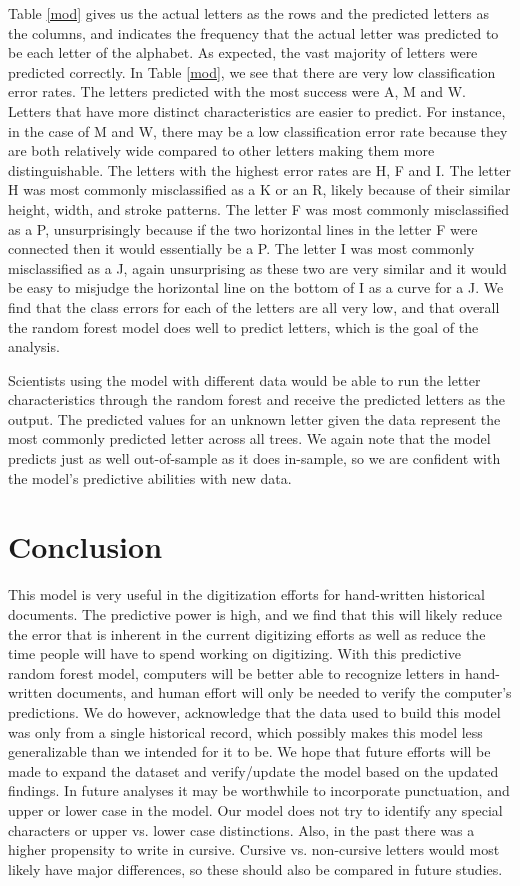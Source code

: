 \documentclass{svproc}
\begin{document}
Table \ref{mod} gives us the actual letters as the rows and the predicted letters as the columns, and indicates the frequency that the actual letter was predicted to be each letter of the alphabet. As expected, the vast majority of letters were predicted correctly. In Table \ref{mod}, we see that there are very low classification error rates. The letters predicted with the most success were A, M and W. Letters that have more distinct characteristics are easier to predict. For instance, in the case of M and W, there may be a low classification error rate because they are both relatively wide compared to other letters making them more distinguishable. The letters with the highest error rates are H, F and I. The letter H was most commonly misclassified as a K or an R, likely because of their similar height, width, and stroke patterns. The letter F was most commonly misclassified as a P, unsurprisingly because if the two horizontal lines in the letter F were connected then it would essentially be a P. The letter I was most commonly misclassified as a J, again unsurprising as these two are very similar and it would be easy to misjudge the horizontal line on the bottom of I as a curve for a J. We find that the class errors for each of the letters are all very low, and that overall the random forest model does well to predict letters, which is the goal of the analysis.

Scientists using the model with different data would be able to run the letter characteristics through the random forest and receive the predicted letters as the output. The predicted values for an unknown letter given the data represent the most commonly predicted letter across all trees. We again note that the model predicts just as well out-of-sample as it does in-sample, so we are confident with the model's predictive abilities with new data. 

\section{Conclusion}

This model is very useful in the digitization efforts for hand-written historical documents. The predictive power is high, and we find that this will likely reduce the error that is inherent in the current digitizing efforts as well as reduce the time people will have to spend working on digitizing. With this predictive random forest model, computers will be better able to recognize letters in hand-written documents, and human effort will only be needed to verify the computer's predictions. We do however, acknowledge that the data used to build this model was only from a single historical record, which possibly makes this model less generalizable than we intended for it to be. We hope that future efforts will be made to expand the dataset and verify/update the model based on the updated findings. In future analyses it may be worthwhile to incorporate punctuation, and upper or lower case in the model. Our model does not try to identify any special characters or upper vs. lower case distinctions. Also, in the past there was a higher propensity to write in cursive. Cursive vs. non-cursive letters would most likely have major differences, so these should also be compared in future studies.
\end{document}

